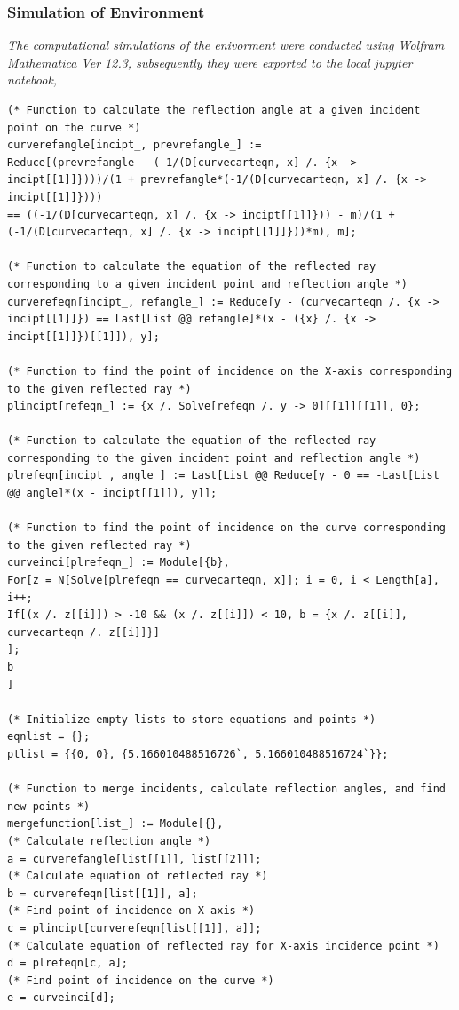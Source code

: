 \documentclass[12pt,a4paper,twoside]{report}
\begin{document}
\subsubsection{Simulation of Environment}
\textit{The computational simulations of the enivorment were conducted using Wolfram Mathematica Ver 12.3, subsequently they were exported to the local jupyter notebook,}\\

\begin{lstlisting}[style=mathematica]
(* Function to calculate the reflection angle at a given incident point on the curve *)
curverefangle[incipt_, prevrefangle_] := 
Reduce[(prevrefangle - (-1/(D[curvecarteqn, x] /. {x -> incipt[[1]]})))/(1 + prevrefangle*(-1/(D[curvecarteqn, x] /. {x -> incipt[[1]]})))
== ((-1/(D[curvecarteqn, x] /. {x -> incipt[[1]]})) - m)/(1 + (-1/(D[curvecarteqn, x] /. {x -> incipt[[1]]}))*m), m];

(* Function to calculate the equation of the reflected ray corresponding to a given incident point and reflection angle *)
curverefeqn[incipt_, refangle_] := Reduce[y - (curvecarteqn /. {x -> incipt[[1]]}) == Last[List @@ refangle]*(x - ({x} /. {x -> incipt[[1]]})[[1]]), y];

(* Function to find the point of incidence on the X-axis corresponding to the given reflected ray *)
plincipt[refeqn_] := {x /. Solve[refeqn /. y -> 0][[1]][[1]], 0};

(* Function to calculate the equation of the reflected ray corresponding to the given incident point and reflection angle *)
plrefeqn[incipt_, angle_] := Last[List @@ Reduce[y - 0 == -Last[List @@ angle]*(x - incipt[[1]]), y]];

(* Function to find the point of incidence on the curve corresponding to the given reflected ray *)
curveinci[plrefeqn_] := Module[{b},
For[z = N[Solve[plrefeqn == curvecarteqn, x]]; i = 0, i < Length[a], i++;
If[(x /. z[[i]]) > -10 && (x /. z[[i]]) < 10, b = {x /. z[[i]], curvecarteqn /. z[[i]]}]
];
b
]

(* Initialize empty lists to store equations and points *)
eqnlist = {};
ptlist = {{0, 0}, {5.166010488516726`, 5.166010488516724`}};

(* Function to merge incidents, calculate reflection angles, and find new points *)
mergefunction[list_] := Module[{},
(* Calculate reflection angle *)
a = curverefangle[list[[1]], list[[2]]];
(* Calculate equation of reflected ray *)
b = curverefeqn[list[[1]], a];
(* Find point of incidence on X-axis *)
c = plincipt[curverefeqn[list[[1]], a]];
(* Calculate equation of reflected ray for X-axis incidence point *)
d = plrefeqn[c, a];
(* Find point of incidence on the curve *)
e = curveinci[d];


\end{lstlisting}
\end{document}
